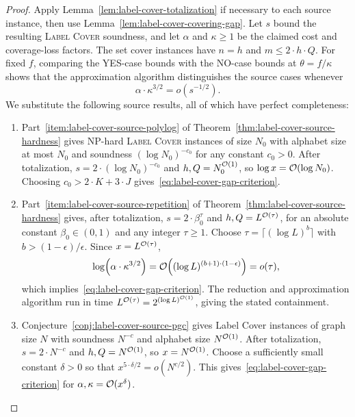 \begin{proof}
    Apply Lemma~\ref{lem:label-cover-totalization} if necessary to each source instance, then use Lemma~\ref{lem:label-cover-covering-gap}. Let $s$ bound the resulting \textup{\textsc{Label Cover}} soundness, and let $\alpha$ and $\kappa\geq1$ be the claimed cost and coverage-loss factors. The set cover instances have $n=h$ and $m\leq2\cdot h\cdot Q$. For fixed $f$, comparing the YES-case bounds with the NO-case bounds at $\theta=f/\kappa$ shows that the approximation algorithm distinguishes the source cases whenever
    \begin{equation}\label{eq:label-cover-gap-criterion}
        \alpha\cdot\kappa^{3/2}=o(s^{-1/2}).
    \end{equation}
    We substitute the following source results, all of which have perfect completeness:
    \begin{enumerate}
        \item Part~\ref{item:label-cover-source-polylog} of Theorem~\ref{thm:label-cover-source-hardness} gives $\mathrm{NP}$-hard \textup{\textsc{Label Cover}} instances of size $N_0$ with alphabet size at most $N_0$ and soundness $(\log N_0)^{-c_0}$ for any constant $c_0>0$. After totalization, $s=2\cdot(\log N_0)^{-c_0}$ and $h,Q=N_0^{\mathcal{O}(1)}$, so $\log x=\mathcal{O}(\log N_0)$. Choosing $c_0>2\cdot K+3\cdot J$ gives~\eqref{eq:label-cover-gap-criterion}.
        \item Part~\ref{item:label-cover-source-repetition} of Theorem~\ref{thm:label-cover-source-hardness} gives, after totalization, $s=2\cdot\beta_0^\tau$ and $h,Q=L^{\mathcal{O}(\tau)}$, for an absolute constant $\beta_0\in(0,1)$ and any integer $\tau\geq1$. Choose $\tau=\lceil(\log L)^b\rceil$ with $b>(1-\epsilon)/\epsilon$. Since $x=L^{\mathcal{O}(\tau)}$,
        \[
            \log\mathopen{}\left( \alpha\cdot\kappa^{3/2} \right)
            =\mathcal{O}\mathopen{}\left( (\log L)^{(b+1)\cdot(1-\epsilon)} \right)
            =o(\tau),
        \]
        which implies~\eqref{eq:label-cover-gap-criterion}. The reduction and approximation algorithm run in time $L^{\mathcal{O}(\tau)}=2^{(\log L)^{\mathcal{O}(1)}}$, giving the stated containment.
        \item Conjecture~\ref{conj:label-cover-source-pgc} gives Label Cover instances of graph size $N$ with soundness $N^{-c}$ and alphabet size $N^{\mathcal{O}(1)}$. After totalization, $s=2\cdot N^{-c}$ and $h,Q=N^{\mathcal{O}(1)}$, so $x=N^{\mathcal{O}(1)}$. Choose a sufficiently small constant $\delta>0$ so that $x^{5\cdot\delta/2}=o(N^{c/2})$. This gives~\eqref{eq:label-cover-gap-criterion} for $\alpha,\kappa=\mathcal{O}(x^\delta)$.
    \end{enumerate}
\end{proof}

